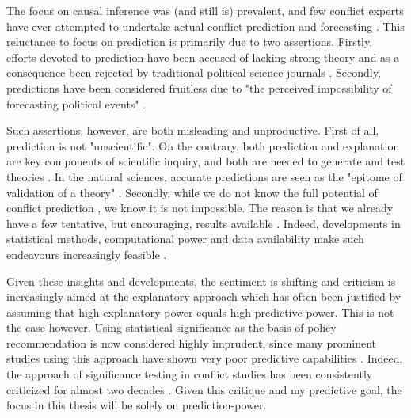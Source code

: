 \documentclass[a4paper]{article}
\begin{document}
The focus on causal inference was (and still is) prevalent, and few conflict experts have ever attempted to undertake actual conflict prediction and forecasting \citep[474]{cederman2017predicting}. This reluctance to focus on prediction is primarily due to two assertions. Firstly, efforts devoted to prediction have been accused of lacking strong theory and as a consequence been rejected by traditional political science journals \citep[8-9]{chadefaux2017conflict}. Secondly, predictions have been considered fruitless due to "the perceived impossibility of forecasting political events" \citep[8]{chadefaux2017conflict}.

Such assertions, however, are both misleading and unproductive. First of all, prediction is not "unscientific". On the contrary, both prediction and explanation are key components of scientific inquiry, and both are needed to generate and test theories \citep[8]{chadefaux2017conflict}. In the natural sciences, accurate predictions are seen as the "epitome of validation of a theory" \citep[289]{Schrodt_2014}. Secondly, while we do not know the full potential of conflict prediction \citep{cederman2017predicting, chadefaux2017conflict}, we know it is not impossible. The reason is that we already have a few tentative, but encouraging, results available \citep{Goldstone_2010, perry_2013, mueller_2016, Maase}. Indeed, developments in statistical methods, computational power and data availability make such endeavours increasingly feasible \citep{ol2010afghanistan, perry_2013}.\par

Given these insights and developments, the sentiment is shifting and criticism is increasingly aimed at the explanatory approach which has often been justified by assuming that high explanatory power equals high predictive power\citep[8]{chadefaux2017conflict}. This is not the case however. Using statistical significance as the basis of policy recommendation is now considered highly imprudent, since many prominent studies using this approach have shown very poor predictive capabilities \citep{Ward_Greenhill_Bakke_2010, Schrodt_2014, chadefaux2017conflict}. Indeed, the approach of significance testing in conflict studies has been consistently criticized for almost two decades \citep{king_zeng_2001b, Ward_Greenhill_Bakke_2010, Goldstone_2010, Schrodt_2014, chadefaux2017conflict}. Given this critique and my predictive goal, the focus in this thesis will be solely on prediction-power.\par
\end{document}
